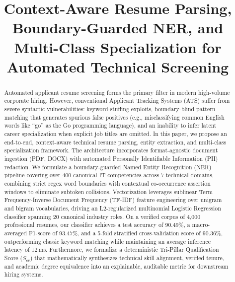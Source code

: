 \documentclass[conference]{IEEEtran}
\begin{document}
\title{Context-Aware Resume Parsing, Boundary-Guarded NER, and Multi-Class Specialization for Automated Technical Screening}

\author{
}

\maketitle

\begin{abstract}
Automated applicant resume screening forms the primary filter in modern high-volume corporate hiring. However, conventional Applicant Tracking Systems (ATS) suffer from severe syntactic vulnerabilities: keyword-stuffing exploits, boundary-blind pattern matching that generates spurious false positives (e.g., misclassifying common English words like ``go'' as the Go programming language), and an inability to infer latent career specialization when explicit job titles are omitted. In this paper, we propose an end-to-end, context-aware technical resume parsing, entity extraction, and multi-class specialization framework. The architecture incorporates format-agnostic document ingestion (PDF, DOCX) with automated Personally Identifiable Information (PII) redaction. We formulate a boundary-guarded Named Entity Recognition (NER) pipeline covering over 400 canonical IT competencies across 7 technical domains, combining strict regex word boundaries with contextual co-occurrence assertion windows to eliminate subtoken collisions. Vectorization leverages sublinear Term Frequency-Inverse Document Frequency (TF-IDF) feature engineering over unigram and bigram vocabularies, driving an L2-regularized multinomial Logistic Regression classifier spanning 20 canonical industry roles. On a verified corpus of 4,000 professional resumes, our classifier achieves a test accuracy of 90.49\%, a macro-averaged F1-score of 93.47\%, and a 5-fold stratified cross-validation score of 90.36\%, outperforming classic keyword matching while maintaining an average inference latency of 12\,ms. Furthermore, we formalize a deterministic Tri-Pillar Qualification Score ($S_{cv}$) that mathematically synthesizes technical skill alignment, verified tenure, and academic degree equivalence into an explainable, auditable metric for downstream hiring systems.
\end{abstract}
\end{document}
